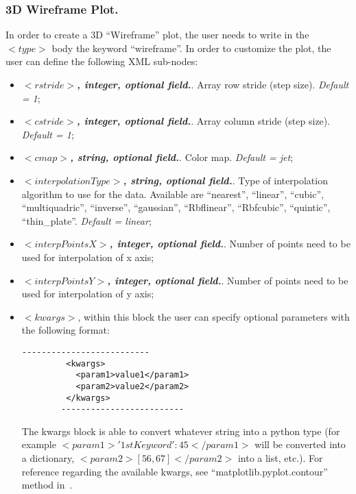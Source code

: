 \subsubsection{3D Wireframe Plot.}
In order to create a 3D ``Wireframe'' plot, the user needs to write in the $<type>$ body the keyword ``wireframe''. In order to customize the plot, the user can define the following XML sub-nodes:
  \begin{itemize}
     \item $<rstride>$\textbf{\textit{, integer, optional  field.}}. Array row stride (step size). \textit{Default = 1}; 
     \item $<cstride>$\textbf{\textit{, integer, optional  field.}}. Array column stride (step size). \textit{Default = 1};
     \item $<cmap>$\textbf{\textit{, string, optional  field.}}. Color map. \textit{Default = jet};
     \item $<interpolationType>$\textbf{\textit{, string, optional  field.}}. Type of interpolation algorithm to use for the data. Available are ``nearest'', ``linear'', ``cubic'', ``multiquadric'', ``inverse'', ``gaussian'', ``Rbflinear'', ``Rbfcubic'', ``quintic'', ``thin\_plate''. \textit{Default = linear};
     \item $<interpPointsX>$\textbf{\textit{, integer, optional  field.}}. Number of points need to be used for interpolation of x axis;
     \item $<interpPointsY>$\textbf{\textit{, integer, optional  field.}}. Number of points need to be used for interpolation of y axis;
 \item \textit{$<kwargs>$},  within this block the user can specify optional parameters with the following format:
        \begin{lstlisting}[style=XML]
        --------------------------
         <kwargs>
           <param1>value1</param1>
           <param2>value2</param2>
         </kwargs>
        -------------------------
       \end{lstlisting}
         The kwargs block is able to convert whatever string into a python type (for example $<param1>{'1stKeyword':45}</param1>$ will be converted into a dictionary, $<param2>[56,67]</param2>$ into a list, etc.). For reference regarding the available kwargs, see ``matplotlib.pyplot.contour'' method in~\cite{MatPlotLib}.
    \end{itemize}

